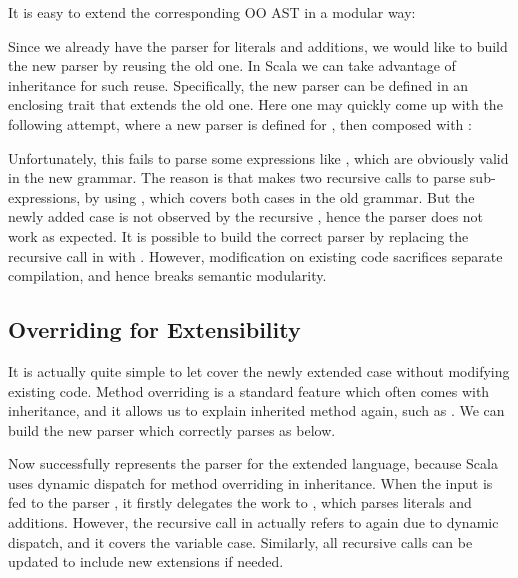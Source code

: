 It is easy to extend the corresponding OO AST in a modular way:


Since we already have the parser for literals and additions, we would
like to build the new parser by reusing the old one. In Scala we can take advantage of inheritance for such reuse. Specifically,
the new parser can be defined in an enclosing trait that extends
the old one. Here one may quickly come up
with the following attempt, where a new parser is defined for , then composed
with :


Unfortunately, this fails to parse some expressions like , which are obviously valid in the new grammar.
The reason is that  makes two recursive calls to parse sub-expressions, by using , which
covers both cases in the old grammar. But the newly added case  is not observed by the recursive ,
hence the parser does not work as expected. It is possible to build the correct parser by replacing the recursive call in  with .
However, modification on existing code sacrifices separate compilation, and hence breaks semantic modularity.

\subsection{Overriding for Extensibility}\label{subsec:overriding}

It is actually quite simple to let  cover the newly extended case without modifying existing code. Method overriding is a standard feature which often comes with inheritance, and it allows us to explain inherited method again, such as . We can build the new parser which correctly parses  as below.


Now  successfully represents the parser for the extended language, because Scala uses dynamic dispatch for
method overriding in inheritance. When the input  is fed to the parser , it firstly delegates
the work to , which parses literals and additions. However, the recursive call  in 
actually refers to  again due to dynamic dispatch, and it covers the variable case. Similarly, all recursive calls can be updated to include new extensions if needed.

